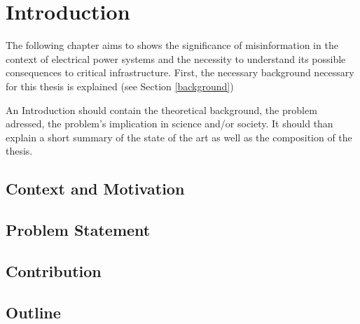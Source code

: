 \chapter{Introduction}

The following chapter aims to
shows the significance of misinformation in the context of
electrical power systems and the necessity to understand its
possible consequences to critical infrastructure. 
First, the necessary background necessary for this thesis is explained
(see Section \ref{background})

An Introduction should contain the theoretical background, 
the problem adressed, the problem's implication in science and/or society. 
It should than explain a short summary of the state of the art  as well 
as the composition of the thesis.

\section{Context and Motivation}
\section{Problem Statement}
\section{Contribution}
\section{Outline}
